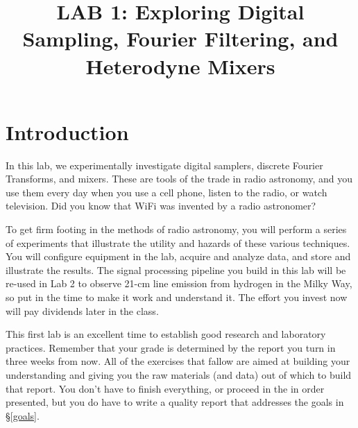 \documentclass[11pt,preprint]{aastex}
\begin{document}
\def\simlt{\lower.5ex\hbox{$\; \buildrel < \over \sim \;$}}
\def\simgt{\lower.5ex\hbox{$\; \buildrel > \over \sim \;$}}
\def\wLO{\omega_0}

\title {LAB 1: Exploring Digital Sampling, Fourier Filtering, and Heterodyne Mixers}

\tableofcontents


\section{Introduction}

\noindent
In this lab, we experimentally investigate digital
samplers, discrete Fourier Transforms, and mixers. These are 
tools of the trade in radio astronomy, and
you use them every day when you use a cell phone, listen to the radio,
or watch television. Did you know that WiFi was invented by a radio
astronomer?

To get firm footing in the methods of radio astronomy, you will perform a series of
experiments that illustrate the utility and hazards of these various techniques. 
You will configure equipment in the lab, acquire and analyze data, and store and illustrate the results.
The signal processing pipeline you build in this lab will be re-used in Lab 2 to
observe 21-cm line emission from hydrogen in the Milky Way, so 
put in the time to make it work and understand it. The effort you
invest now will pay dividends later in the class.

This first lab is an excellent time to establish good research and laboratory practices.
Remember that your grade is determined by the report you turn in
three weeks from now. All of the exercises that fallow are aimed at building your
understanding and giving you the raw materials (and data) out of which to build that report.
You don't have to finish everything, or proceed in the in order presented, but you do have
to write a quality report that addresses the goals in \S\ref{goals}.
\end{document}
